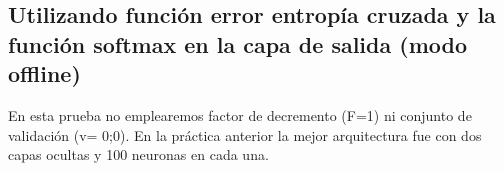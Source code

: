 \subsection{Utilizando función error entropía cruzada y la función softmax en la capa de salida (modo offline)}
En esta prueba no emplearemos factor de decremento (F=1) ni conjunto de validación (v= 0;0). En la práctica anterior la mejor arquitectura fue con dos capas ocultas y 100 neuronas en cada una.

\begin{table}[H]
\centering
\vspace{1ex}
\small
{}
\caption{Errores Base de datos XOR en distintas arquitecturas}
\label{VariacionesDivorce}
\end{table}

